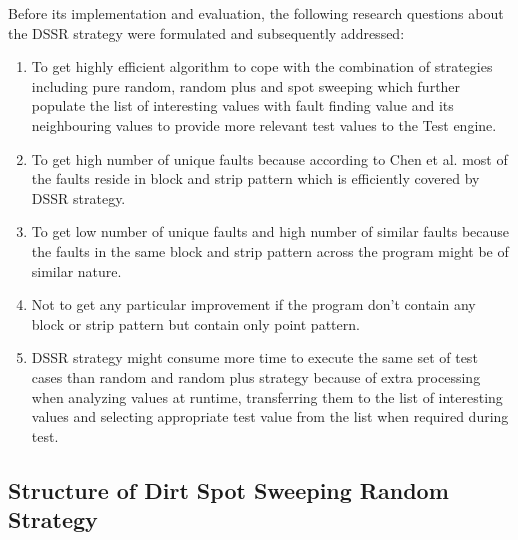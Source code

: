 Before its implementation and evaluation, the following research questions about the DSSR strategy were formulated and subsequently addressed:\\
\begin{enumerate}

\item To get highly efficient algorithm to cope with the combination of strategies including pure random, random plus and spot sweeping which further populate the list of interesting values with fault finding value and its neighbouring values to provide more relevant test values to the Test engine. \\

\item To get high number of unique faults because according to Chen et al. \cite{Chen2006} most of the faults reside in block and strip pattern which is efficiently covered by DSSR strategy. \\

\item To get  low number of unique faults and high number of similar faults because the faults in the same block and strip pattern across the program might be of similar nature.\\

\item  Not to get any particular improvement if the program don't contain any block or strip pattern but contain only point pattern.\\

\item  DSSR strategy might consume more time to execute the same set of test cases than random and random plus strategy because of extra processing when analyzing values at runtime, transferring them to the list of interesting values and selecting appropriate test value from the list when required during test.\\



\end{enumerate}

\subsection{Structure of Dirt Spot Sweeping Random Strategy}


